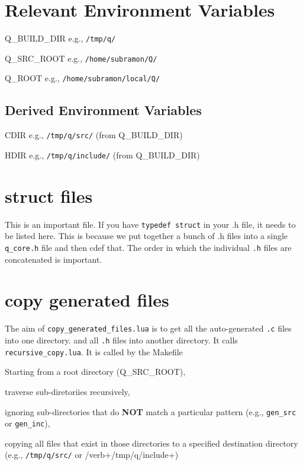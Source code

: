 
\section{Relevant Environment Variables}
\be
\item Q\_BUILD\_DIR e.g., \verb+/tmp/q/+
\item Q\_SRC\_ROOT e.g., \verb+/home/subramon/Q/+
\item Q\_ROOT e.g., \verb+/home/subramon/local/Q/+
\ee

\subsection{Derived Environment Variables}
\be
\item CDIR e.g., \verb+/tmp/q/src/+ (from Q\_BUILD\_DIR)
\item HDIR e.g., \verb+/tmp/q/include/+ (from Q\_BUILD\_DIR)
\ee

\section{struct files}
\label{struct_files}

This is an important file. If you have {\tt typedef struct} in your .h file, it
needs to be listed here. This is because we put together a bunch of .h files
into a single {\tt q\_core.h} file and then cdef that. The order in which the individual {\tt .h} files are concatenated is important.

\section{copy generated files}
\label{copy_generated_files}

The aim of {\tt copy\_generated\_files.lua} is to get all the auto-generated 
{\tt .c} files into one directory.
and all {\tt .h} files into another directory. It calls {\tt
recursive\_copy.lua}. It is called by the Makefile

\bi
\item Starting from a root directory (Q\_SRC\_ROOT), 
\item traverse sub-diretoriies recursively, 
\item ignoring sub-directories that do {\bf NOT} match a particular
pattern (e.g., \verb+gen_src+ or \verb+gen_inc+), 
\item copying all files that exist in
those directories to a specified destination directory (e.g., \verb+/tmp/q/src/+
or /verb+/tmp/q/include+)
\ei


